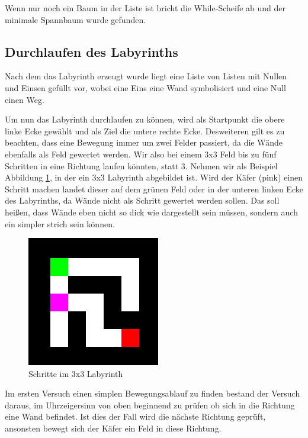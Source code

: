 \documentclass[12pt, a4paper, titlepage]{article}
\begin{document}
Wenn nur noch ein Baum in der Liste ist bricht die While-Scheife ab und der minimale Spannbaum wurde gefunden.

\subsection{Durchlaufen des Labyrinths}

Nach dem das Labyrinth erzeugt wurde liegt eine Liste von Listen mit Nullen und Einsen gefüllt vor, wobei eine Eins eine Wand symbolisiert und eine Null einen Weg.


\bigskip

Um nun das Labyrinth durchlaufen zu können, wird als Startpunkt die obere linke Ecke gewählt und als Ziel die untere rechte Ecke. Desweiteren gilt es zu beachten, dass eine Bewegung immer um zwei Felder passiert, da die Wände ebenfalls als Feld gewertet werden.
Wir also bei einem 3x3 Feld bis zu fünf Schritten in eine Richtung laufen könnten, statt 3.
Nehmen wir als Beispiel Abbildung \ref{fig: laby}, in der ein 3x3 Labyrinth abgebildet ist. Wird der Käfer (pink) einen Schritt machen landet dieser auf dem grünen Feld oder in der unteren linken Ecke des Labyrinths, da Wände nicht als Schritt gewertet werden sollen. Das soll heißen, dass Wände eben nicht so dick wie dargestellt sein müssen, sondern auch ein simpler strich sein können.

\begin{figure}[h]
	\centering
	\includegraphics[scale=.5]{labyrinth.png}
	\caption{Schritte im 3x3 Labyrinth}
	\label{fig: laby}
\end{figure}

\bigskip

Im ersten Versuch einen simplen Bewegungsablauf zu finden bestand der Versuch daraus, im Uhrzeigersinn von oben beginnend zu prüfen ob sich in die Richtung eine Wand befindet.
Ist dies der Fall wird die nächste Richtung geprüft, ansonsten bewegt sich der Käfer ein Feld in diese Richtung.
\end{document}
